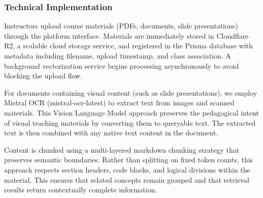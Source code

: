 \documentclass{stylefiles/capstone}
\begin{document}
\subsubsection{Technical Implementation}

Instructors upload course materials (PDFs, documents, slide presentations) through the platform interface. Materials are immediately stored in Cloudflare R2, a scalable cloud storage service, and registered in the Prisma database with metadata including filename, upload timestamp, and class association. A background vectorization service begins processing asynchronously to avoid blocking the upload flow.

For documents containing visual content (such as slide presentations), we employ Mistral OCR (mistral-ocr-latest) to extract text from images and scanned materials. This Vision Language Model approach preserves the pedagogical intent of visual teaching materials by converting them to queryable text. The extracted text is then combined with any native text content in the document.

Content is chunked using a multi-layered markdown chunking strategy that preserves semantic boundaries. Rather than splitting on fixed token counts, this approach respects section headers, code blocks, and logical divisions within the material. This ensures that related concepts remain grouped and that retrieval results return contextually complete information.
\end{document}
